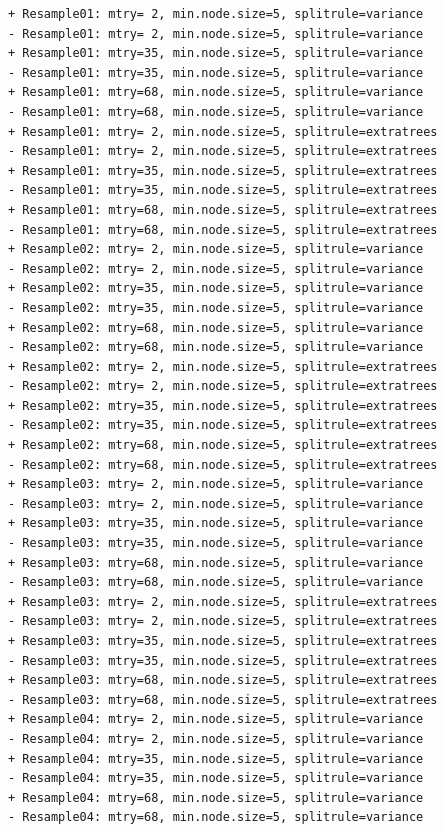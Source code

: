 \documentclass[
  letterpaper,
  DIV=11,
  numbers=noendperiod]{scrartcl}
\begin{document}
\begin{verbatim}
+ Resample01: mtry= 2, min.node.size=5, splitrule=variance 
- Resample01: mtry= 2, min.node.size=5, splitrule=variance 
+ Resample01: mtry=35, min.node.size=5, splitrule=variance 
- Resample01: mtry=35, min.node.size=5, splitrule=variance 
+ Resample01: mtry=68, min.node.size=5, splitrule=variance 
- Resample01: mtry=68, min.node.size=5, splitrule=variance 
+ Resample01: mtry= 2, min.node.size=5, splitrule=extratrees 
- Resample01: mtry= 2, min.node.size=5, splitrule=extratrees 
+ Resample01: mtry=35, min.node.size=5, splitrule=extratrees 
- Resample01: mtry=35, min.node.size=5, splitrule=extratrees 
+ Resample01: mtry=68, min.node.size=5, splitrule=extratrees 
- Resample01: mtry=68, min.node.size=5, splitrule=extratrees 
+ Resample02: mtry= 2, min.node.size=5, splitrule=variance 
- Resample02: mtry= 2, min.node.size=5, splitrule=variance 
+ Resample02: mtry=35, min.node.size=5, splitrule=variance 
- Resample02: mtry=35, min.node.size=5, splitrule=variance 
+ Resample02: mtry=68, min.node.size=5, splitrule=variance 
- Resample02: mtry=68, min.node.size=5, splitrule=variance 
+ Resample02: mtry= 2, min.node.size=5, splitrule=extratrees 
- Resample02: mtry= 2, min.node.size=5, splitrule=extratrees 
+ Resample02: mtry=35, min.node.size=5, splitrule=extratrees 
- Resample02: mtry=35, min.node.size=5, splitrule=extratrees 
+ Resample02: mtry=68, min.node.size=5, splitrule=extratrees 
- Resample02: mtry=68, min.node.size=5, splitrule=extratrees 
+ Resample03: mtry= 2, min.node.size=5, splitrule=variance 
- Resample03: mtry= 2, min.node.size=5, splitrule=variance 
+ Resample03: mtry=35, min.node.size=5, splitrule=variance 
- Resample03: mtry=35, min.node.size=5, splitrule=variance 
+ Resample03: mtry=68, min.node.size=5, splitrule=variance 
- Resample03: mtry=68, min.node.size=5, splitrule=variance 
+ Resample03: mtry= 2, min.node.size=5, splitrule=extratrees 
- Resample03: mtry= 2, min.node.size=5, splitrule=extratrees 
+ Resample03: mtry=35, min.node.size=5, splitrule=extratrees 
- Resample03: mtry=35, min.node.size=5, splitrule=extratrees 
+ Resample03: mtry=68, min.node.size=5, splitrule=extratrees 
- Resample03: mtry=68, min.node.size=5, splitrule=extratrees 
+ Resample04: mtry= 2, min.node.size=5, splitrule=variance 
- Resample04: mtry= 2, min.node.size=5, splitrule=variance 
+ Resample04: mtry=35, min.node.size=5, splitrule=variance 
- Resample04: mtry=35, min.node.size=5, splitrule=variance 
+ Resample04: mtry=68, min.node.size=5, splitrule=variance 
- Resample04: mtry=68, min.node.size=5, splitrule=variance 

\end{verbatim}
\end{document}
